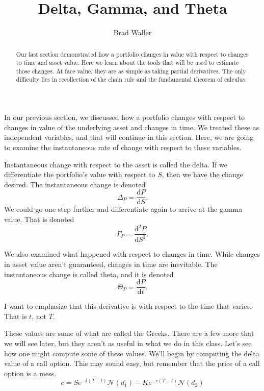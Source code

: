 \documentclass{ximera}
\author{Brad Waller}
\title{Delta, Gamma, and Theta}
\begin{document}
\begin{abstract}
Our last section demonstrated how a portfolio changes in value with respect to changes to time and asset value. Here we learn about the tools that will be used to estimate those changes. At face value, they are as simple as taking partial derivatives. The only difficulty lies in recollection of the chain rule and the fundamental theorem of calculus.
\end{abstract}

\maketitle

In our previous section, we discussed how a portfolio changes with respect to changes in value of the underlying asset and changes in time. We treated these as independent variables, and that will continue in this section. Here, we are going to examine the instantaneous rate of change with respect to these variables.

Instantaneous change with respect to the asset is called the delta. If we differentiate the portfolio's value with respect to $S$, then we have the change desired. The instantaneous change is denoted
\begin{equation*}
\Delta_P=\frac{\mathrm{d}P}{\mathrm{d}S}.
\end{equation*}
We could go one step further and differentiate again to arrive at the gamma value. That is denoted
\begin{equation*}
\Gamma_P=\frac{\mathrm{d}^2P}{\mathrm{d}S^2}.
\end{equation*}

We also examined what happened with respect to changes in time. While changes in asset value aren't guaranteed, changes in time are inevitable. The instantaneous change is called theta, and it is denoted
\begin{equation*}
\Theta_P=\frac{\mathrm{d}P}{\mathrm{d}t}.
\end{equation*}

I want to emphasize that this derivative is with respect to the time that varies. That is $t$, not $T$. 

These values are some of what are called the Greeks. There are a few more that we will see later, but they aren't as useful in what we do in this class. Let's see how one might compute some of these values. We'll begin by computing the delta value of a call option. This may sound easy, but remember that the price of a call option is a mess.
\begin{equation*}
c=Se^{-\delta (T-t)}\mathcal{N}(d_1)-Ke^{-r(T-t)}\mathcal{N}(d_2)
\end{equation*}
\end{document}
